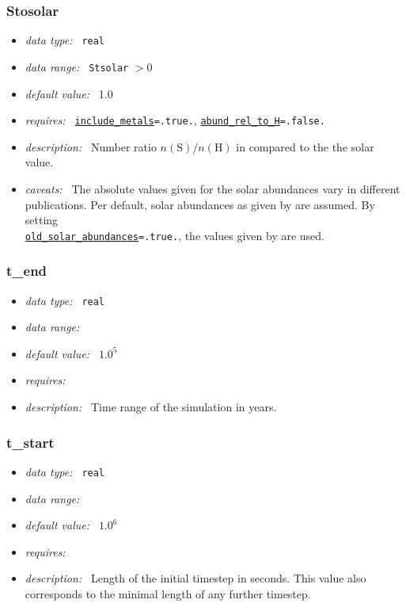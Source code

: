 \documentclass[a4paper,10pt]{article}
\begin{document}
\subsubsection{Stosolar}
\label{opt:stosolar}
\begin{itemize}
 \item \textit{data type:~} \texttt{real}
 \item \textit{data range:~}  \texttt{Stsolar} $> 0$
 \item \textit{default value:~} 1.0
 \item \textit{requires:~} \texttt{\hyperref[opt:includemetals]{include\_metals}=.true.},
 \texttt{\hyperref[opt:abundreltoh]{abund\_rel\_to\_H}=.false.}
 \item \textit{description:~} Number ratio $n(\mathrm{S})/n(\mathrm{H})$ in 
  compared to the the solar value.
 \item \textit{caveats:~} The absolute values given for the solar abundances  
  vary in different publications. Per default, solar abundances as given by 
  \cite{Asplund2009} are assumed. By setting \\
  \texttt{\hyperref[opt:oldsolarabundances]{old\_solar\_abundances}=.true.}, 
  the values given by \cite{Grevesse1998} are used.
\end{itemize}


\subsubsection{t\_end}
\label{opt:tend}
\begin{itemize}
 \item \textit{data type:~} \texttt{real}
 \item \textit{data range:~}
 \item \textit{default value:~} $1.0^5$
 \item \textit{requires:~}
 \item \textit{description:~} Time range of the simulation in years.
\end{itemize}


\subsubsection{t\_start}
\label{opt:tstart}
\begin{itemize}
 \item \textit{data type:~} \texttt{real}
 \item \textit{data range:~}
 \item \textit{default value:~} $1.0^6$
 \item \textit{requires:~}
 \item \textit{description:~} Length of the initial timestep in seconds. 
 This value also corresponds to the minimal length of any further timestep.
\end{itemize}
\end{document}
